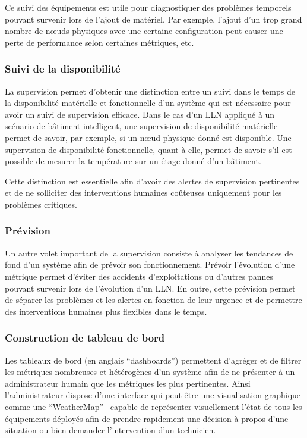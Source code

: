 Ce suivi des équipements est utile pour diagnostiquer des problèmes temporels pouvant survenir lors de l'ajout de matériel.
Par exemple, l'ajout d'un trop grand nombre de nœuds physiques avec une certaine configuration peut causer une perte de performance selon certaines métriques, etc.

\subsubsection{Suivi de la disponibilité}

La supervision permet d'obtenir une distinction entre un suivi dans le temps de la disponibilité matérielle et fonctionnelle d'un système qui est nécessaire pour avoir un suivi de supervision efficace.
Dans le cas d'un \ac{LLN} appliqué à un scénario de bâtiment intelligent, une supervision de disponibilité matérielle permet de savoir, par exemple, si un nœud physique donné est disponible.
Une supervision de disponibilité fonctionnelle, quant à elle, permet de savoir s'il est possible de mesurer la température sur un étage donné d'un bâtiment.

Cette distinction est essentielle afin d'avoir des alertes de supervision pertinentes et de ne solliciter des interventions humaines coûteuses uniquement pour les problèmes  critiques.

\subsubsection{Prévision}

Un autre volet important de la supervision consiste à analyser les tendances de fond d'un système afin de prévoir son fonctionnement.
Prévoir l'évolution d'une métrique permet d'éviter des accidents d'exploitations ou d'autres pannes pouvant survenir lors de l'évolution d'un \ac{LLN}.
En outre, cette prévision permet de séparer les problèmes et les alertes en fonction de leur urgence et de permettre des interventions humaines plus flexibles dans le temps.

\subsubsection{Construction de tableau de bord}

Les tableaux de bord (en anglais ``dashboards'') permettent d’agréger et de filtrer les métriques nombreuses et hétérogènes d'un système afin de ne présenter à un administrateur humain que les métriques les plus pertinentes.
Ainsi l'administrateur dispose d'une interface qui peut être une visualisation graphique comme une ``WeatherMap''~\cite{haiyan2008application} capable de représenter visuellement l'état de tous les équipements déployés afin de prendre rapidement une décision à propos d'une situation ou bien demander l'intervention d'un technicien.

